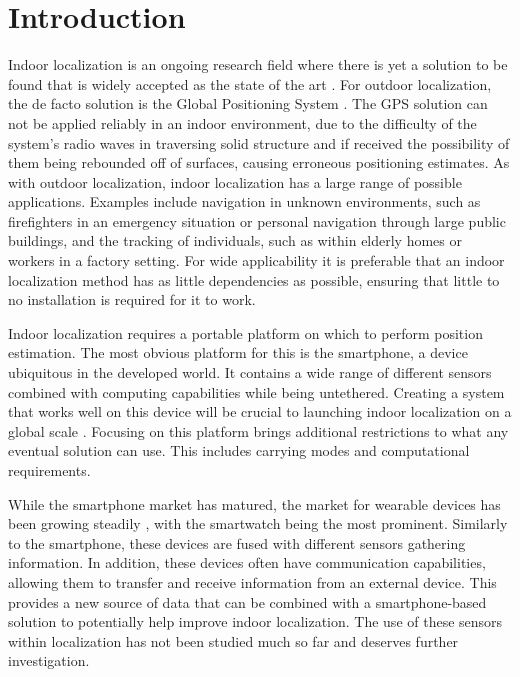 
\chapter{Introduction} \label{chap:intro}

Indoor localization is an ongoing research field where there is yet a solution to be found that is widely accepted as the state of the art \cite{Davidson2017}. For outdoor localization, the de facto solution is the Global Positioning System \cite{Jackermeier2018}. The GPS solution can not be applied reliably in an indoor environment, due to the difficulty of the system's radio waves in traversing solid structure and if received the possibility of them being rebounded off of surfaces, causing erroneous positioning estimates. As with outdoor localization, indoor localization has a large range of possible applications. Examples include navigation in unknown environments, such as firefighters in an emergency situation or personal navigation through large public buildings, and the tracking of individuals, such as within elderly homes or workers in a factory setting. For wide applicability it is preferable that an indoor localization method has as little dependencies as possible, ensuring that little to no installation is required for it to work. \par 
Indoor localization requires a portable platform on which to perform position estimation. The most obvious platform for this is the smartphone, a device ubiquitous in the developed world. It contains a wide range of different sensors combined with computing capabilities while being untethered. Creating a system that works well on this device will be crucial to launching indoor localization on a global scale \cite{Gu2019}. Focusing on this platform brings additional restrictions to what any eventual solution can use. This includes carrying modes and computational requirements. \par 
While the smartphone market has matured, the market for wearable devices has been growing steadily \cite{jung2016consumer}, with the smartwatch being the most prominent. Similarly to the smartphone, these devices are fused with different sensors gathering information. In addition, these devices often have communication capabilities, allowing them to transfer and receive information from an external device. This provides a new source of data that can be combined with a smartphone-based solution to potentially help improve indoor localization. The use of these sensors within localization has not been studied much so far and deserves further investigation.



